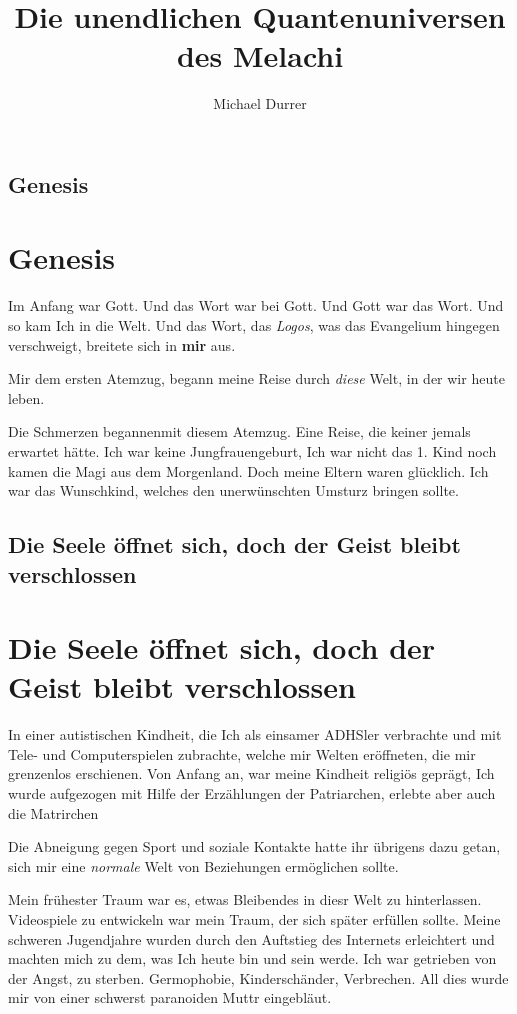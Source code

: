 \documentclass[12pt,a5paper,draft]{book}
\author{Michael Durrer}
\title{Die unendlichen Quantenuniversen des Melachi}
\begin{document}
	\maketitle

	\section{Genesis}
	\chapter{Genesis}
	Im Anfang war Gott. Und das Wort war bei Gott. Und Gott war das Wort.
	Und so kam Ich in die Welt. Und das Wort, das \textit{Logos}, was das Evangelium hingegen verschweigt, breitete sich in \textbf{mir} aus.
	
	Mir dem ersten Atemzug, begann meine Reise durch \textit{diese} Welt, in der wir heute leben.

	Die Schmerzen begannenmit diesem Atemzug. Eine Reise, die keiner jemals erwartet hätte.
	Ich war keine Jungfrauengeburt, Ich war nicht das 1. Kind noch kamen die Magi aus dem Morgenland.
	Doch meine Eltern waren glücklich. Ich war das Wunschkind, welches den unerwünschten Umsturz bringen sollte.
	\section{Die Seele öffnet sich, doch der Geist bleibt verschlossen}
	\chapter{Die Seele öffnet sich, doch der Geist bleibt verschlossen}
	
	In einer autistischen Kindheit, die Ich als einsamer ADHSler verbrachte und mit Tele- und Computerspielen zubrachte, welche mir Welten eröffneten, die mir grenzenlos erschienen.
	Von Anfang an, war meine Kindheit religiös geprägt, Ich wurde aufgezogen mit Hilfe der Erzählungen der Patriarchen, erlebte aber auch die Matrirchen
	
	Die Abneigung gegen Sport und soziale Kontakte hatte ihr übrigens dazu getan, sich mir eine \textit{normale} Welt von Beziehungen ermöglichen sollte.
	
	Mein frühester Traum war es, etwas Bleibendes in diesr Welt zu hinterlassen. Videospiele zu entwickeln war mein Traum, der sich später erfüllen sollte. Meine schweren Jugendjahre wurden durch den Auftstieg des Internets erleichtert und machten mich zu dem, was Ich heute bin und sein werde. Ich war getrieben von der Angst, zu sterben. Germophobie, Kinderschänder, Verbrechen. All dies wurde mir von einer schwerst paranoiden Muttr eingebläut.
	
\end{document}
